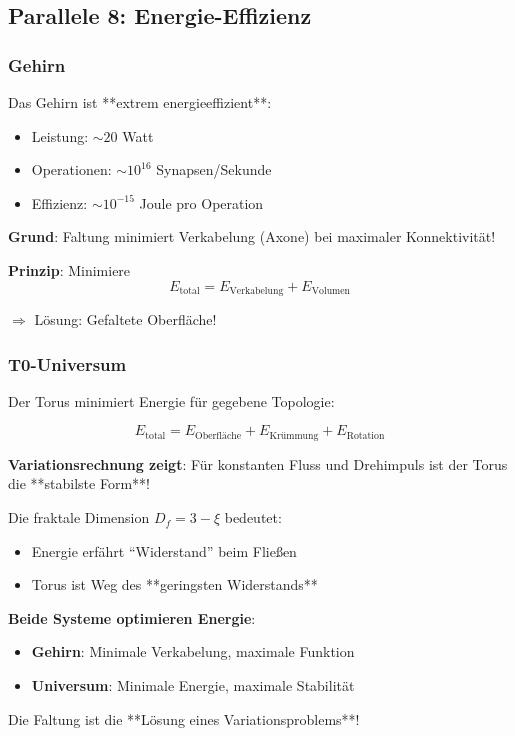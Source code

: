 	\subsection{Parallele 8: Energie-Effizienz}
	
	\subsubsection{Gehirn}
	
	Das Gehirn ist **extrem energieeffizient**:
	
	\begin{itemize}
		\item Leistung: $\sim 20$ Watt
		\item Operationen: $\sim 10^{16}$ Synapsen/Sekunde
		\item Effizienz: $\sim 10^{-15}$ Joule pro Operation
	\end{itemize}
	
	\textbf{Grund}: Faltung minimiert Verkabelung (Axone) bei maximaler Konnektivität!
	
	\textbf{Prinzip}: Minimiere
	\begin{equation}
		E_{\text{total}} = E_{\text{Verkabelung}} + E_{\text{Volumen}}
	\end{equation}
	
	$\Rightarrow$ Lösung: Gefaltete Oberfläche!
	
	\subsubsection{T0-Universum}
	
	Der Torus minimiert Energie für gegebene Topologie:
	
	\begin{equation}
		E_{\text{total}} = E_{\text{Oberfläche}} + E_{\text{Krümmung}} + E_{\text{Rotation}}
	\end{equation}
	
	\textbf{Variationsrechnung zeigt}: Für konstanten Fluss und Drehimpuls ist der Torus die **stabilste Form**!
	
	Die fraktale Dimension $D_f = 3-\xi$ bedeutet:
	\begin{itemize}
		\item Energie erfährt \enquote{Widerstand} beim Fließen
		\item Torus ist Weg des **geringsten Widerstands**
	\end{itemize}
	
	\begin{keyresult}
		\textbf{Beide Systeme optimieren Energie}:
		
		\begin{itemize}
			\item \textbf{Gehirn}: Minimale Verkabelung, maximale Funktion
			\item \textbf{Universum}: Minimale Energie, maximale Stabilität
		\end{itemize}
		
		Die Faltung ist die **Lösung eines Variationsproblems**!
	\end{keyresult}
	

